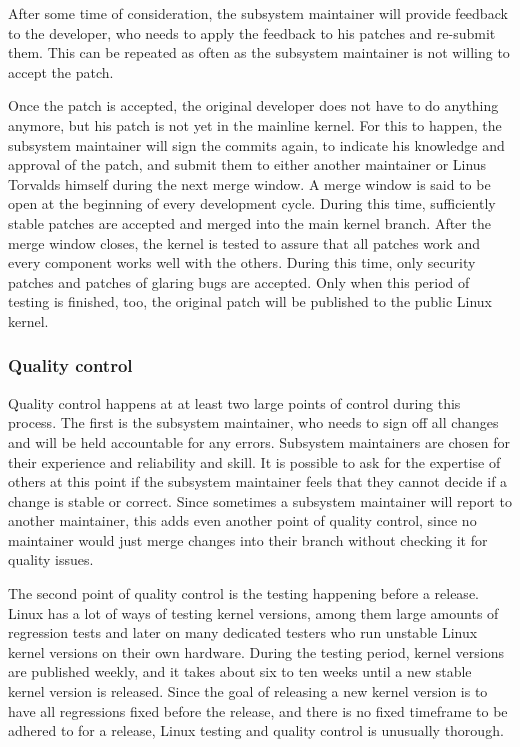 \documentclass{sig-alternate-05-2015}
\begin{document}
After some time of consideration, the subsystem maintainer will provide feedback to the developer, who needs to apply the feedback to his patches and re-submit them.
This can be repeated as often as the subsystem maintainer is not willing to accept the patch.

Once the patch is accepted, the original developer does not have to do anything anymore, but his patch is not yet in the mainline kernel.
For this to happen, the subsystem maintainer will sign the commits again, to indicate his knowledge and approval of the patch, and submit them to either another maintainer or Linus Torvalds himself during the next merge window.
A merge window is said to be open at the beginning of every development cycle.
During this time, sufficiently stable patches are accepted and merged into the main kernel branch.
After the merge window closes, the kernel is tested to assure that all patches work and every component works well with the others.
During this time, only security patches and patches of glaring bugs are accepted.
Only when this period of testing is finished, too, the original patch will be published to the public Linux kernel.

\subsubsection{Quality control}

Quality control happens at at least two large points of control during this process.
The first is the subsystem maintainer, who needs to sign off all changes and will be held accountable for any errors.
Subsystem maintainers are chosen for their experience and reliability and skill.
It is possible to ask for the expertise of others at this point if the subsystem maintainer feels that they cannot decide if a change is stable or correct.
Since sometimes a subsystem maintainer will report to another maintainer, this adds even another point of quality control, since no maintainer would just merge changes into their branch without checking it for quality issues.

The second point of quality control is the testing happening before a release.
Linux has a lot of ways of testing kernel versions, among them large amounts of regression tests and later on many dedicated testers who run unstable Linux kernel versions on their own hardware.
During the testing period, kernel versions are published weekly, and it takes about six to ten weeks until a new stable kernel version is released.
Since the goal of releasing a new kernel version is to have all regressions fixed before the release, and there is no fixed timeframe to be adhered to for a release, Linux testing and quality control is unusually thorough.
\end{document}
